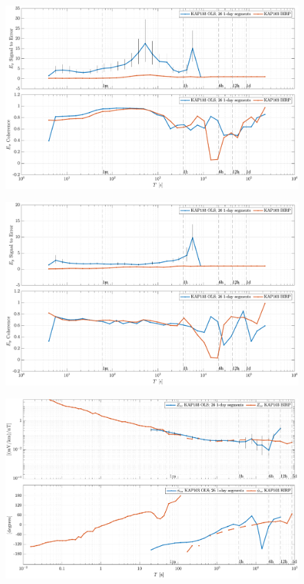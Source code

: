 \documentclass{article}
\begin{document}
\begin{figure}[h!]
\centering
\includegraphics[width=\textwidth]{figures/KAP103/SN_compare-E_x.pdf}
\caption{}
\label{fig:universe}
\end{figure}

\begin{figure}[h!]
\centering
\includegraphics[width=\textwidth]{figures/KAP103/SN_compare-E_y.pdf}
\caption{}
\label{fig:universe}
\end{figure}

\clearpage

\begin{figure}[h!]
\centering
\includegraphics[width=\textwidth]{figures/KAP103/transferfnZ_compare-Z_xx_Magnitude_Phase.pdf}
\caption{}
\end{figure}
\end{document}
